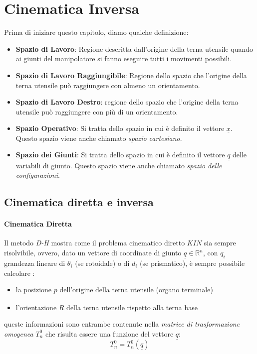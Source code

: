 \chapter{Cinematica Inversa}

Prima di iniziare questo capitolo, diamo qualche definizione:
\begin{itemize}
	\item \textbf{Spazio di Lavoro}: Regione descritta dall’origine della terna utensile quando ai giunti del manipolatore si fanno eseguire tutti i movimenti possibili.
	\item \textbf{Spazio di Lavoro Raggiungibile}: Regione dello spazio che l’origine della terna utensile può raggiungere con almeno un orientamento.
	\item \textbf{Spazio di Lavoro Destro}: regione dello spazio che l’origine della terna utensile può raggiungere con più di un orientamento.
	\item \textbf{Spazio Operativo}: Si tratta dello spazio in cui è definito il vettore $\underline{x}$. Questo spazio viene anche chiamato \emph{spazio cartesiano}.
	\item \textbf{Spazio dei Giunti}: Si tratta dello spazio in cui è definito il vettore $\underline{q}$ delle variabili di giunto. Questo spazio viene anche chiamato \emph{spazio delle configurazioni}. 
\end{itemize}

\section{Cinematica diretta e inversa}
\subsubsection{Cinematica Diretta}
Il metodo \emph{D-H} mostra come il problema cinematico diretto $KIN$ sia sempre risolvibile, ovvero, dato un vettore di coordinate di giunto $\underline{q}\in\mathbb{R}^n$, con $q_i$ grandezza lineare di $\theta_i$ (se rotoidale) o di $d_i$ (se prismatico), è sempre possibile calcolare :
\begin{itemize}
	\item la posizione $\underline{p}$ dell'origine della terna utensile (organo terminale)
	\item l'orientazione $R$ della terna utensile rispetto alla terna base
\end{itemize}
queste informazioni sono entrambe contenute nella \emph{matrice di trasformazione omogenea} $T_n^0$ che risulta essere una funzione del vettore $\underline{q}$:
\begin{equation} \label{tensore}
	T_n^0 = T_n^0(\underline{q})
\end{equation}

